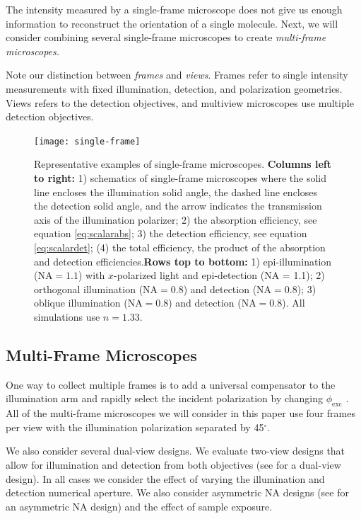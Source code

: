 \documentclass[10pt]{article}
\begin{document}
The intensity measured by a single-frame microscope does not give us enough
information to reconstruct the orientation of a single molecule. Next, we
will consider combining several single-frame microscopes to create
\emph{multi-frame microscopes.}

Note our distinction between \emph{frames} and \emph{views}. Frames refer to
single intensity measurements with fixed illumination, detection, and
polarization geometries. Views refers to the detection objectives, and multiview
microscopes use multiple detection objectives.

\begin{figure}[H]
\centering\texttt{[image: single-frame]}
\caption{Representative examples of single-frame microscopes.\newline \newline
  \textbf{Columns left to right:} 1) schematics of single-frame microscopes
  where the solid line encloses the illumination solid angle, the dashed line
  encloses the detection solid angle, and the arrow indicates the transmission
  axis of the illumination polarizer; 2) the absorption efficiency, see equation
  \ref{eq:scalarabs}; 3) the detection efficiency, see equation
  \ref{eq:scalardet}; (4) the total efficiency, the product of the absorption and
  detection efficiencies.\newline \newline \textbf{Rows top to bottom:} 1)
  epi-illumination ($\text{NA} = 1.1$) with $x$-polarized light and
  epi-detection (NA = 1.1); 2) orthogonal illumination ($\text{NA} = 0.8$) and
  detection ($\text{NA} = 0.8$); 3) oblique illumination ($\text{NA} = 0.8$) and
  detection ($\text{NA} = 0.8$). All simulations use $n=1.33$.}
  \label{fig:single-frame}
\end{figure}


\subsection{Multi-Frame Microscopes}\label{designs}
One way to collect multiple frames is to add a universal compensator to the
illumination arm and rapidly select the incident polarization by changing
$\phi_{\text{exc}}$ \cite{oldenbourg1995}. All of the multi-frame microscopes we
will consider in this paper use four frames per view with the illumination
polarization separated by 45${}^{\circ}$.

We also consider several dual-view designs. We evaluate two-view designs that
allow for illumination and detection from both objectives (see \cite{wu2013} for
a dual-view design). In all cases we consider the effect of varying the
illumination and detection numerical aperture. We also consider asymmetric NA
designs (see \cite{wu2017} for an asymmetric NA design) and the effect of
sample exposure.
\end{document}
